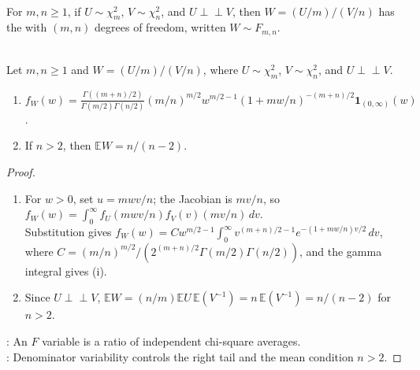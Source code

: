 \begin{definition} \label{def:f-distribution} \\
For $m,n\geq1$, if $U\sim\chi_m^2$, $V\sim\chi_n^2$, and $U\perp\!\!\!\perp V$, then $W=(U/m)/(V/n)$ has the  with $(m,n)$ degrees of freedom, written $W\sim F_{m,n}$.
\end{definition}

\begin{proposition} \label{prop:f-density} \\
Let $m,n\geq1$ and $W=(U/m)/(V/n)$, where $U\sim\chi_m^2$, $V\sim\chi_n^2$, and $U\perp\!\!\!\perp V$.
\begin{enumerate}[label=(\roman*)]
\setlength{\itemsep}{0pt}
\item
$f_W(w)=\frac{\Gamma((m+n)/2)}{\Gamma(m/2)\Gamma(n/2)}(m/n)^{m/2}w^{m/2-1}(1+mw/n)^{-(m+n)/2}\mathbf{1}_{(0,\infty)}(w)$.
\item
If $n>2$, then $\mathbb{E}W=n/(n-2)$.
\end{enumerate}
\begin{proof}
\begin{enumerate}[label=(\roman*)]
\setlength{\itemsep}{0pt}
\item For $w>0$, set $u=mwv/n$; the Jacobian is $mv/n$, so $f_W(w)=\int_0^\infty f_U(mwv/n)f_V(v)(mv/n)\,dv$.\\
Substitution gives $f_W(w)=Cw^{m/2-1}\int_0^\infty v^{(m+n)/2-1}e^{-(1+mw/n)v/2}\,dv$,\\
where $C=(m/n)^{m/2}/(2^{(m+n)/2}\Gamma(m/2)\Gamma(n/2))$, and the gamma integral gives (i).
\item
Since $U\perp\!\!\!\perp V$, $\mathbb{E}W=(n/m)\mathbb{E}U\,\mathbb{E}(V^{-1})=n\,\mathbb{E}(V^{-1})=n/(n-2)$ for $n>2$.
\end{enumerate}
: An $F$ variable is a ratio of independent chi-square averages.\\
: Denominator variability controls the right tail and the mean condition $n>2$.
\end{proof}
\end{proposition}

